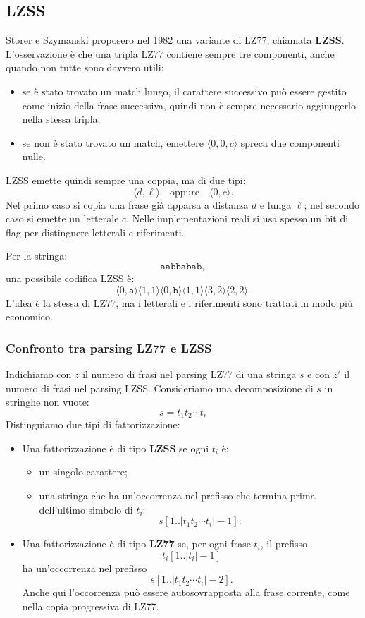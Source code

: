 \documentclass{article}
\theoremstyle{definition}
\numberwithin{equation}{section}
\begin{document}
\subsection{LZSS}
Storer e Szymanski proposero nel 1982 una variante di LZ77, chiamata \textbf{LZSS}. L'osservazione è che una tripla LZ77 contiene sempre tre componenti, anche quando non tutte sono davvero utili:
\begin{itemize}
    \item se è stato trovato un match lungo, il carattere successivo può essere gestito come inizio della frase successiva, quindi non è sempre necessario aggiungerlo nella stessa tripla;
    \item se non è stato trovato un match, emettere $\langle 0,0,c\rangle$ spreca due componenti nulle.
\end{itemize}

LZSS emette quindi sempre una coppia, ma di due tipi:
\[
    \langle d,\ell\rangle
    \quad\text{oppure}\quad
    \langle 0,c\rangle.
\]
Nel primo caso si copia una frase già apparsa a distanza $d$ e lunga $\ell$; nel secondo caso si emette un letterale $c$. Nelle implementazioni reali si usa spesso un bit di flag per distinguere letterali e riferimenti.

Per la stringa:
\[
    \texttt{aabbabab},
\]
una possibile codifica LZSS è:
\[
    \langle 0,\texttt{a}\rangle
    \langle 1,1\rangle
    \langle 0,\texttt{b}\rangle
    \langle 1,1\rangle
    \langle 3,2\rangle
    \langle 2,2\rangle.
\]
L'idea è la stessa di LZ77, ma i letterali e i riferimenti sono trattati in modo più economico.

\subsubsection{Confronto tra parsing LZ77 e LZSS}
Indichiamo con $z$ il numero di frasi nel parsing LZ77 di una stringa $s$ e con $z'$ il numero di frasi nel parsing LZSS. Consideriamo una decomposizione di $s$ in stringhe non vuote:
\[
    s=t_1t_2\cdots t_r
\]
Distinguiamo due tipi di fattorizzazione:
\begin{itemize}
    \item Una fattorizzazione è di tipo \textbf{LZSS} se ogni $t_i$ è:
          \begin{itemize}
              \item un singolo carattere;
              \item una stringa che ha un'occorrenza nel prefisso che termina prima dell'ultimo simbolo di $t_i$:
                    \[
                        s[1..|t_1t_2\cdots t_i|-1].
                    \]
          \end{itemize}

    \item Una fattorizzazione è di tipo \textbf{LZ77} se, per ogni frase $t_i$, il prefisso
          \[
              t_i[1..|t_i|-1]
          \]
          ha un'occorrenza nel prefisso
          \[
              s[1..|t_1t_2\cdots t_i|-2].
          \]
          Anche qui l'occorrenza può essere autosovrapposta alla frase corrente, come nella copia progressiva di LZ77.
\end{itemize}
\end{document}
